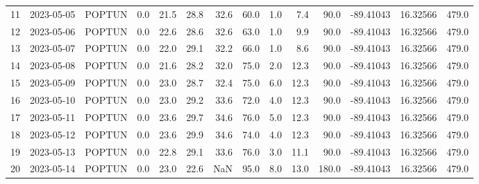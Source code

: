 \documentclass[12pt]{article}
\begin{document}
\begin{center}
\begin{tabular}{lllrrrrrrrrrrr}
11  & 2023-05-05 &  POPTUN &     0.0 &  21.5 &   28.8 &  32.6 &     60.0 &  1.0 &         7.4 &        90.0 & -89.41043 &  16.32566 &    479.0 \\
12  & 2023-05-06 &  POPTUN &     0.0 &  22.6 &   28.6 &  32.6 &     63.0 &  1.0 &         9.9 &        90.0 & -89.41043 &  16.32566 &    479.0 \\
13  & 2023-05-07 &  POPTUN &     0.0 &  22.0 &   29.1 &  32.2 &     66.0 &  1.0 &         8.6 &        90.0 & -89.41043 &  16.32566 &    479.0 \\
14  & 2023-05-08 &  POPTUN &     0.0 &  21.6 &   28.2 &  32.0 &     75.0 &  2.0 &        12.3 &        90.0 & -89.41043 &  16.32566 &    479.0 \\
15  & 2023-05-09 &  POPTUN &     0.0 &  23.0 &   28.7 &  32.4 &     75.0 &  6.0 &        12.3 &        90.0 & -89.41043 &  16.32566 &    479.0 \\
16  & 2023-05-10 &  POPTUN &     0.0 &  23.0 &   29.2 &  33.6 &     72.0 &  4.0 &        12.3 &        90.0 & -89.41043 &  16.32566 &    479.0 \\
17  & 2023-05-11 &  POPTUN &     0.0 &  23.6 &   29.7 &  34.6 &     76.0 &  5.0 &        12.3 &        90.0 & -89.41043 &  16.32566 &    479.0 \\
18  & 2023-05-12 &  POPTUN &     0.0 &  23.6 &   29.9 &  34.6 &     74.0 &  4.0 &        12.3 &        90.0 & -89.41043 &  16.32566 &    479.0 \\
19  & 2023-05-13 &  POPTUN &     0.0 &  22.8 &   29.1 &  33.6 &     76.0 &  3.0 &        11.1 &        90.0 & -89.41043 &  16.32566 &    479.0 \\
20  & 2023-05-14 &  POPTUN &     0.0 &  23.0 &   22.6 &   NaN &     95.0 &  8.0 &        13.0 &       180.0 & -89.41043 &  16.32566 &    479.0 \\
\bottomrule
\end{tabular}

        
        \end{center}
        
\end{document}
